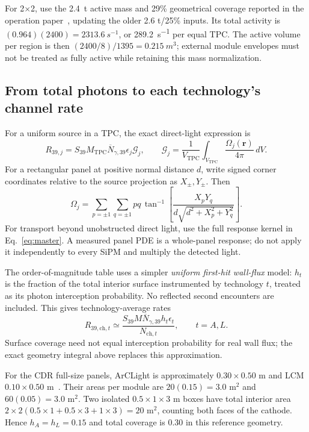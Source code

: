 For 2$\times$2, use the \SI{2.4}{t} active mass and 29\% geometrical
coverage reported in the operation paper~\cite{nd_operation}, updating the
older 2.6 t/25\% inputs. Its total activity is
$(0.964)(2400)=\SI{2313.6}{s^{-1}}$, or \SI{289.2}{s^{-1}} per equal TPC.
The active volume per region is then
$(2400/8)/1395=\SI{0.215}{m^3}$; external module envelopes must not be
 treated as fully active while retaining this mass normalization.

\subsection{From total photons to each technology's channel rate}

For a uniform source in a TPC, the exact direct-light expression is
\begin{equation}
R_{39,j}=S_{39}M_{\mathrm{TPC}}\overline N_{\gamma,39}\epsilon_j
\mathcal G_j,\qquad
\mathcal G_j=\frac{1}{V_{\mathrm{TPC}}}\int_{V_{\mathrm{TPC}}}
\frac{\Omega_j(\bm r)}{4\pi}\,dV.
\label{eq:ND39exact}
\end{equation}
For a rectangular panel at positive normal distance $d$, write signed corner
coordinates relative to the source projection as $X_\pm,Y_\pm$. Then
\begin{equation}
\Omega_j=\sum_{p=\pm1}\sum_{q=\pm1}pq\,
\tan^{-1}\!\left[\frac{X_pY_q}
{d\sqrt{d^2+X_p^2+Y_q^2}}\right].
\label{eq:NDsolidangle}
\end{equation}
For transport beyond unobstructed direct light, use the full response kernel
in Eq.~\eqref{eq:master}. A measured panel PDE is a whole-panel response;
 do not apply it independently to every SiPM and multiply the detected light.

The order-of-magnitude table uses a simpler \emph{uniform first-hit wall-flux}
model: $h_t$ is the fraction of the total interior surface instrumented by
technology $t$, treated as its photon interception probability. No reflected
second encounters are included. This gives technology-average rates
\begin{equation}
\boxed{R_{39,\mathrm{ch},t}\simeq
\frac{S_{39}M\overline N_{\gamma,39}h_t\epsilon_t}
{N_{\mathrm{ch},t}},\qquad t=A,L.}
\label{eq:NDchannel}
\end{equation}
Surface coverage need not equal interception probability for real wall flux;
 the exact geometry integral above replaces this approximation.

For the CDR full-size panels, ArCLight is approximately $0.30\times0.50$ m
and LCM $0.10\times0.50$ m~\cite{nd_cdr}. Their areas per module are
$20(0.15)=3.0$ m$^2$ and $60(0.05)=3.0$ m$^2$. Two isolated
$0.5\times1\times3$ m boxes have total interior area
$2\times2(0.5\times1+0.5\times3+1\times3)=20$ m$^2$,
counting both faces of the cathode. Hence $h_A=h_L=0.15$ and total
coverage is 0.30 in this reference geometry.

